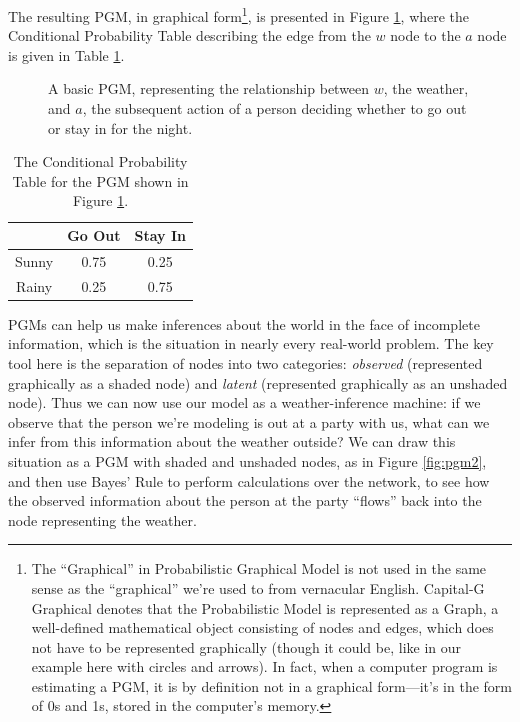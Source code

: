 \begin{subappendices}
The resulting PGM, in graphical form\footnote{The ``Graphical'' in Probabilistic Graphical Model is not used in the same sense as the ``graphical'' we're used to from vernacular English. Capital-G Graphical denotes that the Probabilistic Model is represented as a Graph, a well-defined mathematical object consisting of nodes and edges, which does not have to be represented graphically (though it could be, like in our example here with circles and arrows). In fact, when a computer program is estimating a PGM, it is by definition not in a graphical form---it's in the form of 0s and 1s, stored in the computer's memory.}, is presented in Figure \ref{fig:pgm1}, where the Conditional Probability Table describing the edge from the $w$ node to the $a$ node is given in Table \ref{tab:cpt1}.

\begin{figure}[ht!]
  \centering
  \caption{A basic PGM, representing the relationship between $w$, the weather, and $a$, the subsequent action of a person deciding whether to go out or stay in for the night.}
  \label{fig:pgm1}
\end{figure}


\begin{table}[ht!]
    \centering
    \begin{tabular}{c|cc}
         & \textsf{Go Out} & \textsf{Stay In} \\\hline
       \textsf{Sunny} & 0.75 & 0.25 \\
       \textsf{Rainy} & 0.25 & 0.75 \\
    \end{tabular}
    \caption{The Conditional Probability Table for the PGM shown in Figure \ref{fig:pgm1}.}
    \label{tab:cpt1}
\end{table}

PGMs can help us make inferences about the world in the face of incomplete information, which is the situation in nearly every real-world problem. The key tool here is the separation of nodes into two categories: \textit{observed} (represented graphically as a shaded node) and \textit{latent} (represented graphically as an unshaded node). Thus we can now use our model as a weather-inference machine: if we observe that the person we're modeling is out at a party with us, what can we infer from this information about the weather outside? We can draw this situation as a PGM with shaded and unshaded nodes, as in Figure \ref{fig:pgm2}, and then use Bayes' Rule to perform calculations over the network, to see how the observed information about the person at the party ``flows'' back into the node representing the weather.


\end{subappendices}
